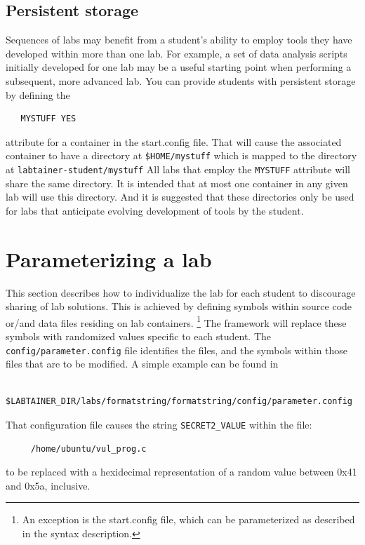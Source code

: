 \documentclass[12pt]{article}
\begin{document}
\subsection{Persistent storage}
\label{persistent}
Sequences of labs may benefit from a student's ability to employ tools they have developed within more than one lab.
For example, a set of data analysis scripts initially developed for one lab may be a useful starting point when
performing a subsequent, more advanced lab.  You can provide students with persistent storage by defining the
\begin{verbatim}
   MYSTUFF YES
\end{verbatim}
\noindent attribute for a container in the start.config file.  That will cause the associated container to have
a directory at {\tt \$HOME/mystuff} which is mapped to the directory at {\tt labtainer-student/mystuff}
All labs that employ the {\tt MYSTUFF} attribute will share the same directory.  It is intended that at most one
container in any given lab will use this directory.  And it is suggested that these directories only be used for
labs that anticipate evolving development of tools by the student.  

\section{Parameterizing a lab}
\label{parameterize}
This section describes how to individualize the lab for each student to discourage
sharing of lab solutions.  This is achieved by defining symbols within source 
code or/and data files residing on lab containers. \footnote{An exception is the
start.config file, which can be parameterized as described in the syntax description.}  
The framework will replace these symbols with randomized values
specific to each student.  The {\tt config/parameter.config} file identifies the files, and
the symbols within those files that are to be modified.  A simple example can be found in 
\begin{verbatim}
    $LABTAINER_DIR/labs/formatstring/formatstring/config/parameter.config
\end{verbatim}

That configuration file causes the string {\tt SECRET2\_VALUE} within the file:
\begin{verbatim}
     /home/ubuntu/vul_prog.c
\end{verbatim}
to be replaced with a hexidecimal representation of a random value
between 0x41 and 0x5a, inclusive.
\end{document}
